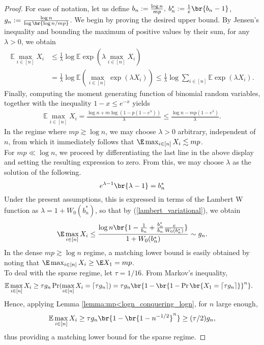 \begin{proof}
For ease of notation, let us define $b_n := \frac{\log n}{mp},\: b_n^*:= \frac1e\br{b_n-1}$, $g_n := \frac{\log{n}}{\log\br{\log n / mp}}$. 
We begin by proving the desired upper bound. 
By Jensen's inequality and bounding the maximum of positive values by their sum, for any $\lambda > 0$, we obtain
\begin{equation*}
\begin{aligned}
    \mathbb{E}\max_{i  \in [n]} X_i & \leq \frac1\lambda \log \mathbb{E}\exp \left(\lambda \max_{i \in [n]} X_i\right) \\
     &=\frac1\lambda \log \mathbb{E}\left(\max_{i \in [n]} \exp\left(\lambda X_i\right)\right) \leq \frac1\lambda \log \sum_{i \in [n]} \mathbb{E}\exp(\lambda X_i).
\end{aligned}
\end{equation*}
Finally, computing the moment generating function of binomial random variables, together with the inequality $1-x\leq e^{-x}$ yields 
\begin{align*}
    \mathbb{E}\max_{i  \in [n]} X_i = \frac{\log{n} + m\log{(1 - p(1-e^\lambda))}}{\lambda} \leq \frac{\log{n} - mp(1 - e^\lambda)}{\lambda}. 
\end{align*}
In the regime where $mp \gtrsim \log n$, we may choose $\lambda > 0$ arbitrary, independent of $n$, from which it immediately follows that $\E \max_{i  \in [n]} X_i \lesssim mp$. \\
\noindent 
For $mp \ll \log n$, we proceed by differentiating the last line in the above display and setting the resulting expression to zero. From this, we may choose $\lambda$ as the solution of the following.
\[e^{\lambda -1}\br{\lambda -1} = b_n^*\]
Under the present assumptions, this is expressed in terms of the Lambert W function as $\lambda = 1+W_0(b_n^*)$, so that by (\ref{lambert_variational}), we obtain
\begin{align*}
    \E \max_{i \in [n]} X_i \leq \frac{\log n\br{1-\frac{1}{b_n}+\frac{b_n^*}{b_n} \frac{e}{W_0(b_n^*)}}}{1+W_0(b_n^*)} \sim g_n. 
\end{align*}
In the dense $mp \gtrsim \log{n}$ regime, a matching lower bound is easily obtained by noting that $\E \max_{i \in [n]} X_i \geq \E X_1 = mp$. \\
\noindent 
To deal with the sparse regime, let $\tau = 1/16$. From Markov's inequality, 
\begin{align*}\label{markov_initial}
\mathbb{E} \max_{i \in [n]} X_i &\geq  \tau g_n \Pr(\max_{i \in [n]} X_i = \lceil \tau g_n \rceil) = \tau g_n \br{1-\br{1-\Pr\br{X_1 = \lceil \tau g_n \rceil}}^n}.
\end{align*}
Hence, applying Lemma  \ref{lemma:mp<logn_conquering_logn}, for $n$ large enough, 
\begin{align*}
   \mathbb{E} \max_{i \in [n]} X_i  \geq \tau g_n \br{1-\br{1-n^{-1/2}}^n} \geq (\tau/2) g_n, 
\end{align*}
thus providing a matching lower bound for the sparse regime.
\end{proof}
